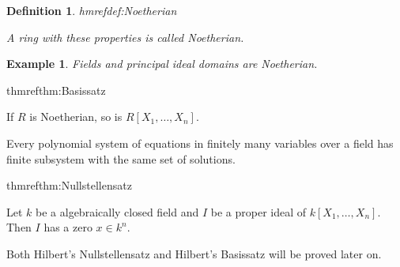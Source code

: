 \documentclass[DIV=14,parskip=full,pointednumbers]{scrartcl}
\theoremstyle{cthm}
\theoremstyle{cvarthm}
\theoremstyle{cdef}
\newtheorem{defi}{Definition}[subsection]
\newtheorem{example}{Example}[subsection]
\newcommand{\lbl}[1]{
	\label{#1}
	\edef\dummy{\curthm}
	\expandafter\xdef\csname thmref#1\endcsname{\dummy}
}
\begin{document}
\begin{defi}\lbl{def:Noetherian}
 A ring with these properties is called \emph{Noetherian}.
\end{defi}
\begin{example}
 Fields and principal ideal domains are Noetherian. 
\end{example}
\begin{thm}\lbl{thm:Basissatz}
 If $R$ is Noetherian, so is $R[X_1,\ldots,X_n]$.
\end{thm}
\begin{cor}
 Every polynomial system of equations in finitely many variables over a field has finite subsystem with the same set of solutions.
\end{cor}
\begin{thm} \lbl{thm:Nullstellensatz}
 Let $k$ be a algebraically closed field and $I$ be a proper ideal of $k[X_1,\ldots,X_n]$. Then $I$ has a zero $x\in k^n$.
\end{thm}
Both Hilbert's Nullstellensatz and Hilbert's Basissatz will be proved later on.
\end{document}
